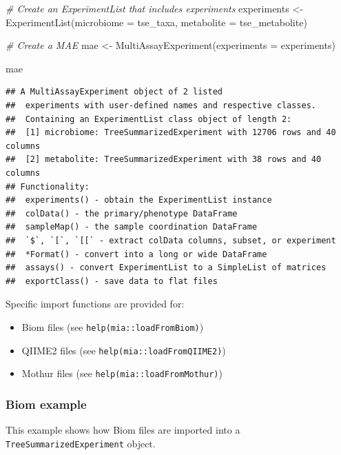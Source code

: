 \documentclass[
]{book}
\newenvironment{Shaded}{\begin{snugshade}}{\end{snugshade}}
\newcommand{\AttributeTok}[1]{\textcolor[rgb]{0.77,0.63,0.00}{#1}}
\newcommand{\CommentTok}[1]{\textcolor[rgb]{0.56,0.35,0.01}{\textit{#1}}}
\newcommand{\FunctionTok}[1]{\textcolor[rgb]{0.00,0.00,0.00}{#1}}
\newcommand{\NormalTok}[1]{#1}
\newcommand{\OtherTok}[1]{\textcolor[rgb]{0.56,0.35,0.01}{#1}}
\providecommand{\tightlist}{%
  \setlength{\itemsep}{0pt}\setlength{\parskip}{0pt}}
\begin{document}
\begin{Shaded}
\begin{Highlighting}[]
\CommentTok{\# Create an ExperimentList that includes experiments}
\NormalTok{experiments }\OtherTok{\textless{}{-}} \FunctionTok{ExperimentList}\NormalTok{(}\AttributeTok{microbiome =}\NormalTok{ tse\_taxa, }
                              \AttributeTok{metabolite =}\NormalTok{ tse\_metabolite)}

\CommentTok{\# Create a MAE}
\NormalTok{mae }\OtherTok{\textless{}{-}} \FunctionTok{MultiAssayExperiment}\NormalTok{(}\AttributeTok{experiments =}\NormalTok{ experiments)}

\NormalTok{mae}
\end{Highlighting}
\end{Shaded}

\begin{verbatim}
## A MultiAssayExperiment object of 2 listed
##  experiments with user-defined names and respective classes.
##  Containing an ExperimentList class object of length 2:
##  [1] microbiome: TreeSummarizedExperiment with 12706 rows and 40 columns
##  [2] metabolite: TreeSummarizedExperiment with 38 rows and 40 columns
## Functionality:
##  experiments() - obtain the ExperimentList instance
##  colData() - the primary/phenotype DataFrame
##  sampleMap() - the sample coordination DataFrame
##  `$`, `[`, `[[` - extract colData columns, subset, or experiment
##  *Format() - convert into a long or wide DataFrame
##  assays() - convert ExperimentList to a SimpleList of matrices
##  exportClass() - save data to flat files
\end{verbatim}

Specific import functions are provided for:

\begin{itemize}
\tightlist
\item
  Biom files (see \texttt{help(mia::loadFromBiom)})
\item
  QIIME2 files (see \texttt{help(mia::loadFromQIIME2)})
\item
  Mothur files (see \texttt{help(mia::loadFromMothur)})
\end{itemize}

\hypertarget{biom-example}{%
\subsubsection{Biom example}\label{biom-example}}

This example shows how Biom files are imported into a
\texttt{TreeSummarizedExperiment} object.
\end{document}
